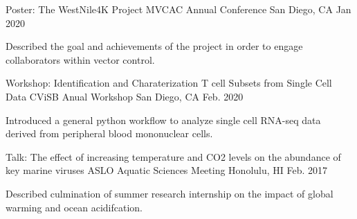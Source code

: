 
\begin{cventries}
  \cventry
    {Poster: The WestNile4K Project} %
    {MVCAC Annual Conference} %
    {San Diego, CA} %
    {Jan 2020} %
    {
      \begin{cvitems} %
        \item {Described the goal and achievements of the project in order to engage collaborators within vector control.}
      \end{cvitems}
    }

  \cventry
    {Workshop: Identification and Charaterization T cell Subsets from Single Cell Data} %
    {CViSB Anual Workshop} %
    {San Diego, CA} %
    {Feb. 2020} %
    {
      \begin{cvitems} %
        \item {Introduced a general python workflow to analyze single cell RNA-seq data derived from peripheral blood mononuclear cells.}
      \end{cvitems}
    }

  \cventry
    {Talk: The effect of increasing temperature and CO2 levels on the abundance of key marine viruses} %
    {ASLO Aquatic Sciences Meeting} %
    {Honolulu, HI} %
    {Feb. 2017} %
    {
      \begin{cvitems} %
        \item {Described culmination of summer research internship on the impact of global warming and ocean acidifcation.}
      \end{cvitems}
    }

\end{cventries}
